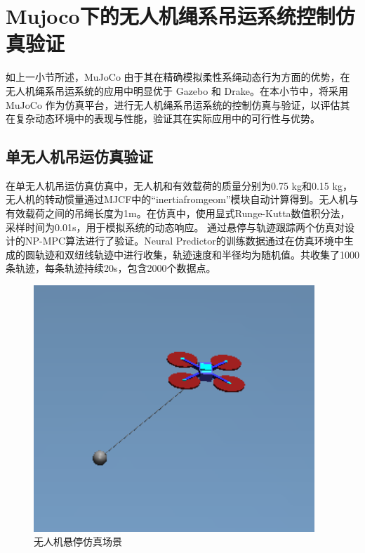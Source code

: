 \documentclass[lang=chs, degree=master, blindreview=false, winfonts=true]{yanputhesis}
\begin{document}
\section{Mujoco下的无人机绳系吊运系统控制仿真验证}
如上一小节所述，MuJoCo 由于其在精确模拟柔性系绳动态行为方面的优势，在无人机绳系吊运系统的应用中明显优于 Gazebo 和 Drake。在本小节中，将采用 MuJoCo 作为仿真平台，进行无人机绳系吊运系统的控制仿真与验证，以评估其在复杂动态环境中的表现与性能，验证其在实际应用中的可行性与优势。

\subsection{单无人机吊运仿真验证}
在单无人机吊运仿真仿真中，无人机和有效载荷的质量分别为0.75 kg和0.15 kg，无人机的转动惯量通过MJCF中的“inertiafromgeom”模块自动计算得到。无人机与有效载荷之间的吊绳长度为1m。在仿真中，使用显式Runge-Kutta数值积分法，采样时间为0.01s，用于模拟系统的动态响应。
通过悬停与轨迹跟踪两个仿真对设计的NP-MPC算法进行了验证。Neural Predictor的训练数据通过在仿真环境中生成的圆轨迹和双纽线轨迹中进行收集，轨迹速度和半径均为随机值。共收集了1000条轨迹，每条轨迹持续20s，包含2000个数据点。
\begin{figure}[hbt!]
	\centering
	\includegraphics[width=25pc]{picture/kk/xuanting.png} 
	\caption{无人机悬停仿真场景} 
	\label{xuanting}
\end{figure}
\end{document}
